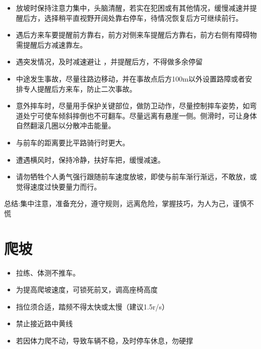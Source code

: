 \documentclass{ctexbook}
\begin{document}
\begin{itemize}
    \item 放坡时保持注意力集中，头脑清醒，若实在犯困或有其他情况，缓慢减速并提醒后方，选择稍平直视野开阔处靠右停车，待情况恢复后方可继续前行。

    \item 遇后方来车要提醒前方靠右，前方对侧来车提醒后方靠右，前方右侧有障碍物需提醒后方减速靠左。

    \item 遇突发情况，及时减速避让 ，并提醒后方，不得做多余停留   

    \item 中途发生事故，尽量往路边移动，并在事故点后方100m以外设置路障或者安排专人提醒后方来车，防止二次事故。

    \item 意外摔车时，尽量用手保护关键部位，做防卫动作，尽量控制摔车姿势，如弯道处宁可使车倾斜摔倒也不可翻车。尽量远离有悬崖一侧。侧滑时，可让身体自然翻滚几圈以分散冲击能量。
    \item 与前车的距离要比平路骑行时更大。
    \item 遭遇横风时，保持冷静，扶好车把，缓慢减速。

    \item 请勿牺牲个人勇气强行跟随前车速度放坡，即使与前车渐行渐远，不敢放，或觉得速度过快要量力而行。
\end{itemize}
总结:集中注意，准备充分，遵守规则，远离危险，掌握技巧，为人为己，谨慎不慌 
\section{爬坡}
\begin{itemize}
    \item 拉练、体测不推车。

    \item 为提高爬坡速度，可锁死前叉，调高座椅高度
    
    \item 挡位须合适，踏频不得太快或太慢（建议1.5r/s）

    \item 禁止接近路中黄线

    \item 若因体力爬不动，导致车辆不稳，及时停车休息，勿硬撑
\end{itemize}
\end{document}
